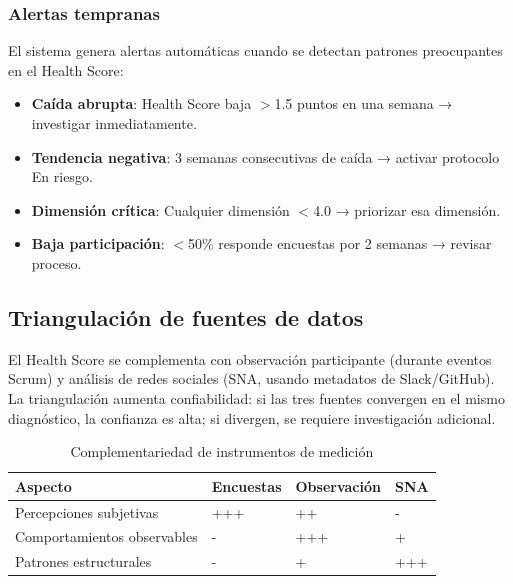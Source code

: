 \FloatBarrier

\subsubsection{Alertas tempranas}

El sistema genera alertas automáticas cuando se detectan patrones preocupantes en el Health Score:

\begin{itemize}
    \item \textbf{Caída abrupta}: Health Score baja $>$1.5 puntos en una semana → investigar inmediatamente.
    \item \textbf{Tendencia negativa}: 3 semanas consecutivas de caída → activar protocolo En riesgo.
    \item \textbf{Dimensión crítica}: Cualquier dimensión $<$4.0 → priorizar esa dimensión.
    \item \textbf{Baja participación}: $<$50\% responde encuestas por 2 semanas → revisar proceso.
\end{itemize}

\subsection{Triangulación de fuentes de datos}

El Health Score se complementa con observación participante (durante eventos Scrum) y análisis de redes sociales (SNA, usando metadatos de Slack/GitHub). La triangulación aumenta confiabilidad: si las tres fuentes convergen en el mismo diagnóstico, la confianza es alta; si divergen, se requiere investigación adicional.

\begin{table}[h]
    \centering
    \small
    \begin{tabularx}{\textwidth}{|l|Y|Y|Y|}
        \hline
        \textbf{Aspecto}            & \textbf{Encuestas} & \textbf{Observación} & \textbf{SNA} \\
        \hline
        Percepciones subjetivas     & +++                & ++                   & -            \\
        \hline
        Comportamientos observables & -                  & +++                  & +            \\
        \hline
        Patrones estructurales      & -                  & +                    & +++          \\
        \hline
    \end{tabularx}
    \caption{Complementariedad de instrumentos de medición}
    \label{tab:triangulacion}
\end{table}

